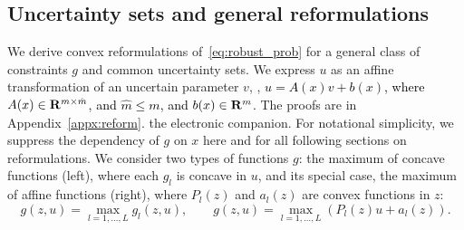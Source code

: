 \documentclass[11pt]{article}
\newcommand{\bsnote}[1]{\noindent\textcolor{red}{\texttt{Bartolomeo: #1}}}
\newcommand{\RC}[1]{\textcolor{black}{#1}}
\begin{document}
\begin{appendices}
\section{Uncertainty sets and general reformulations}
\label{appx:gen_sets}
We derive convex reformulations of~\eqref{eq:robust_prob} for a general class of constraints $g$ and common uncertainty sets. 
We express $u$ as an affine transformation of an uncertain parameter $v$, \ie, \RC{$u = A(x)v + b(x)$, where $A(x) \in {\mathbf R}^{m\times \hat{m}}$, and $\hat{m} \leq m$, and $b(x) \in {\mathbf R}^m$.}
The proofs are in
\ifpreprint
Appendix~\ref{appx:reform}.
\else
the electronic companion.
\fi
For notational simplicity, we suppress the dependency of $g$ on $x$ here and for all following sections on reformulations.
We consider two types of functions $g$: the maximum of concave functions (left), where each $g_l$ is concave in $u$, and its special case, the maximum of affine functions (right), where $P_l(z)$ and $a_l(z)$ are convex functions in $z$:
$$g(z,u) = \max_{l=1,\dots,L} g_l(z,u), \qquad g(z,u) = \max_{l=1,\dots,L} (P_l(z)u + a_l(z)).$$


\end{appendices}
\end{document}
